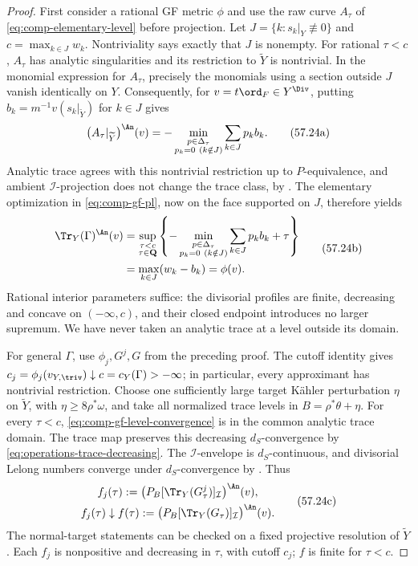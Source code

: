 \begin{proof}
First consider a rational GF metric $\phi$ and use the raw curve
$A_\tau$ of \eqref{eq:comp-elementary-level} before projection.
Let $J=\{k:s_k|_Y\not\equiv0\}$ and $c=\max_{k\in J}w_k$.
Nontriviality says exactly that $J$ is nonempty.
For rational $\tau<c$, $A_\tau$ has analytic singularities and its
restriction to $\widetilde Y$ is nontrivial.
In the monomial expression for $A_\tau$, precisely the monomials
using a section outside $J$ vanish identically on $Y$.
Consequently, for $v=t\ord_F\in Y^{\Div}$, putting
$b_k=m^{-1}v(s_k|_{\widetilde Y})$ for $k\in J$ gives
\[
 \bigl(A_\tau|_{\widetilde Y}\bigr)^{\An}(v)
 =-\min_{\substack{p\in\Delta_\tau\\p_k=0\ (k\notin J)}}
          \sum_{k\in J}p_kb_k.
\tag{57.24a}\label{eq:comp-restricted-section-polytope}
\]
Analytic trace agrees with this nontrivial restriction up to
$P$-equivalence, and ambient $\mathcal I$-projection does not
change the trace class, by .
The elementary optimization in \eqref{eq:comp-gf-pl}, now on the
face supported on $J$, therefore yields
\[
 \begin{aligned}
 \Tr_Y(\Gamma)^{\An}(v)
 &=\sup_{\substack{\tau<c\\\tau\in\mathbf Q}}
       \left\{-\min_{\substack{p\in\Delta_\tau\\p_k=0\ (k\notin J)}}
                       \sum_{k\in J}p_kb_k+\tau\right\}\\
 &=\max_{k\in J}(w_k-b_k)=\phi(v).
 \end{aligned}
\tag{57.24b}\label{eq:comp-gf-trace-value}
\]
Rational interior parameters suffice: the divisorial profiles are
finite, decreasing and concave on $(-\infty,c)$, and their closed
endpoint introduces no larger supremum.
We have never taken an analytic trace at a level outside its domain.

For general $\Gamma$, use $\phi_j,G^j,G$ from the preceding proof.
The cutoff identity gives
$c_j=\phi_j(v_{Y,\triv})\downarrow c=c_Y(\Gamma)>-\infty$;
in particular, every approximant has nontrivial restriction.
Choose one sufficiently large target K\"ahler perturbation $\eta$
on $\widetilde Y$, with $\eta\geq8\rho^*\omega$, and take all
normalized trace levels in $B=\rho^*\theta+\eta$.
For every $\tau<c$, \eqref{eq:comp-gf-level-convergence} is in the
common analytic trace domain. The trace map preserves this
decreasing $d_S$-convergence by \eqref{eq:operations-trace-decreasing}.
The $\mathcal I$-envelope is $d_S$-continuous, and divisorial
Lelong numbers converge under $d_S$-convergence by
\cite[Theorems~6.2.3--6.2.4]{XiaBook}. Thus
\[
 \begin{gathered}
 f_j(\tau):=\bigl(P_B[\Tr_Y(G^j_\tau)]_{\mathcal I}\bigr)^{\An}(v),\\
 f_j(\tau)\downarrow
 f(\tau):=\bigl(P_B[\Tr_Y(G_\tau)]_{\mathcal I}\bigr)^{\An}(v).
 \end{gathered}
\tag{57.24c}\label{eq:comp-trace-profile-convergence}
\]
The normal-target statements can be checked on a fixed projective
resolution of $\widetilde Y$.
Each $f_j$ is nonpositive and decreasing in $\tau$, with cutoff
$c_j$; $f$ is finite for $\tau<c$.


\end{proof}
